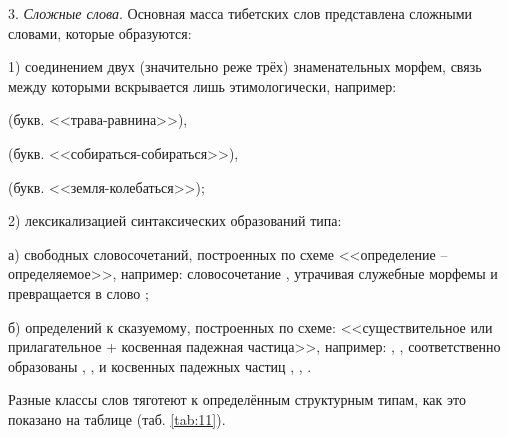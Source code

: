 3. \emph{Сложные слова}. Основная масса тибетских слов представлена сложными словами, которые образуются:

1) соединением двух (значительно реже трёх) знаменательных морфем, связь между которыми вскрывается лишь этимологически, например:
\begin{prfsample}
	\item {} (букв. <<трава-равнина>>),
	\item {} (букв. <<собираться-собираться>>),
	\item {} (букв. <<земля-колебаться>>);
\end{prfsample}

2) лексикализацией синтаксических образований типа:

а) свободных словосочетаний, построенных по схеме <<определение -- определяемое>>, например: словосочетание
, утрачивая служебные морфемы  и  превращается в слово ;

б) определений к сказуемому, построенных по схеме: <<существительное или прилагательное + косвенная падежная частица>>, например: , ,  соответственно образованы , ,  и косвенных падежных частиц , , .

Разные классы слов тяготеют к определённым структурным типам, как это показано на таблице (таб. \ref{tab:11}).

